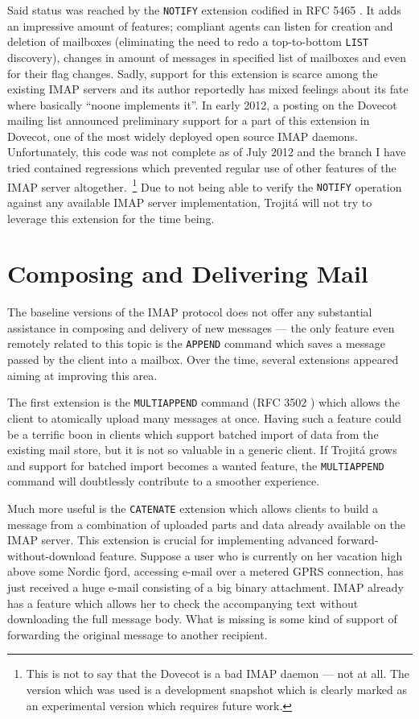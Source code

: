 \documentclass[trojita]{subfiles}
\begin{document}
Said status was reached by the {\tt NOTIFY} extension codified in RFC 5465 \cite{rfc5465}.  It adds an impressive amount
of features; compliant agents can listen for creation and deletion of mailboxes (eliminating the need to redo a
top-to-bottom {\tt LIST} discovery), changes in amount of messages in specified list of mailboxes and even for their
flag changes.  Sadly, support for this extension is scarce among the existing IMAP servers and its author reportedly has
mixed feelings \cite{arnt-good-bad-rfc} about its fate where basically ``noone implements it''.  In early 2012, a
posting on the Dovecot mailing list announced \cite{dovecot-imap-notify} preliminary support for a part of this
extension in Dovecot, one of the most widely deployed open source IMAP daemons.  Unfortunately, this code was not
complete as of July 2012 \cite{dovecot-hg-notify} and the branch I have tried contained regressions which prevented
regular use of other features of the IMAP server altogether.~\footnote{This is not to say that the Dovecot is a bad IMAP
daemon --- not at all.  The version which was used is a development snapshot which is clearly marked as an experimental
version which requires future work.}  Due to not being able to verify the {\tt NOTIFY} operation against any available
IMAP server implementation, Trojitá will not try to leverage this extension for the time being.

\section{Composing and Delivering Mail}

The baseline versions of the IMAP protocol does not offer any substantial assistance in composing and delivery of new
messages --- the only feature even remotely related to this topic is the {\tt APPEND} command which saves a message
passed by the client into a mailbox.  Over the time, several extensions appeared aiming at improving this area.

The first extension is the {\tt MULTIAPPEND} command (RFC 3502 \cite{rfc3502}) which allows the client to atomically
upload many messages at once.  Having such a feature could be a terrific boon in clients which support batched import of
data from the existing mail store, but it is not so valuable in a generic client.  If Trojitá grows and support for
batched import becomes a wanted feature, the {\tt MULTIAPPEND} command will doubtlessly contribute to a smoother
experience.

Much more useful is the {\tt CATENATE} extension \cite{rfc4469} which allows clients to build a message from a
combination of uploaded parts and data already available on the IMAP server.  This extension is crucial for implementing
advanced forward-without-download feature.  Suppose a user who is currently on her vacation high above some Nordic
fjord, accessing e-mail over a metered GPRS connection, has just received a huge e-mail consisting of a big binary
attachment.  IMAP already has a feature which allows her to check the accompanying text without downloading the full
message body.  What is missing is some kind of support of forwarding the original message to another recipient.
\end{document}

